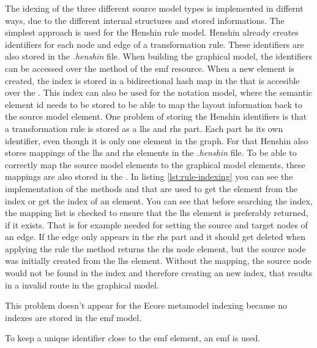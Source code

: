   The idexing of the three different source model types is implemented in differnt ways, due to the different internal structures and stored informations. The simplest approach is used for the Henshin rule model. Henshin already creates identifiers for each node and edge of a transformation rule. These identifiers are also stored in the \textit{.henshin} file. When building the graphical model, the identifiers can be accessed over the method  of the \ac{emf} resource. When a new element is created, the index is stored in a bidirectional hash map in the  that is accesible over the . This index can also be used for the notation model, where the semantic element id needs to be stored to be able to map the layout information back to the source model element. One problem of storing the Henshin identifiers is that a transformation rule is stored as a \ac{lhs} and \ac{rhs} part. Each part hs its own identifier, even though it is only one element in the graph. For that Henshin also stores mappings of the \ac{lhs} and \ac{rhs} elements in the \textit{.henshin} file. To be able to correctly map the source model elements to the graphical model elements, these mappings are also stored in the . In listing \ref{lst:rule-indexing} you can see the implementation of the methods  and  that are used to get the element from the index or get the index of an element. You can see that before searching the index, the mapping list is checked to ensure that the \ac{lhs} element is preferably returned, if it exists. That is for example needed for setting the source and target nodes of an edge. If the edge only appears in the \ac{rhs} part and it should get deleted when applying the rule the  method returns the \ac{rhs} node element, but the source node was initially created from the \ac{lhs} element. Without the mapping, the source node would not be found in the index and therefore creating an new index, that results in a invalid route in the graphical model.

  

  This problem doesn't appear for the Ecore metamodel indexing because no indexes are stored in the \ac{emf} model.
  
  To keep a unique identifier close to the \ac{emf} element, an \ac{emf}  is used. 

